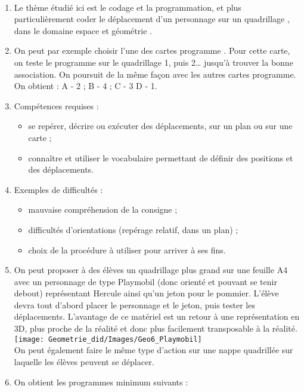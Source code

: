 \ \\ [-5mm]
\begin{enumerate}
   \item Le thème étudié ici est le codage et la programmation, et plus particulièrement \og coder le déplacement d'un personnage sur un quadrillage \fg{}, dans le domaine \og espace et géométrie \fg.
   \item On peut par exemple choisir l'une des cartes \og programme \fg{}. Pour cette carte, on teste le programme sur le quadrillage 1, puis 2\dots {} jusqu'à trouver la bonne association. On poursuit de la même façon avec les autres cartes programme. On obtient : A - 2 \quad ; \quad B - 4 \quad ; \quad C - 3 \quad D - 1.
   \item Compétences requises :
   \begin{itemize}
      \item se repérer, décrire ou exécuter des déplacements, sur un
plan ou sur une carte ;
      \item connaître et utiliser le vocabulaire permettant de définir des
positions et des déplacements.
   \end{itemize}
   \item Exemples de difficultés :
   \begin{itemize}
      \item mauvaise compréhension de la consigne ;
      \item difficultés d'orientations (repérage relatif, dans un plan) ;
      \item choix de la procédure à utiliser pour arriver à ses fins.
   \end{itemize}
   \item On peut proposer à des élèves un quadrillage plus grand sur une feuille A4 avec un personnage de type Playmobil (donc orienté et pouvant se tenir debout) représentant Hercule ainsi qu'un jeton pour le pommier. L'élève devra tout d'abord placer le personnage et le jeton, puis tester les déplacements. L'avantage de ce matériel est un retour à une représentation en 3D, plus proche de la réalité et donc plus facilement transposable à la réalité. \\
   \hspace*{3cm} \texttt{[image: Geometrie\_did/Images/Geo6\_Playmobil]} \\
   On peut également faire le même type d'action sur une nappe quadrillée sur laquelle les élèves peuvent se déplacer.
   \item On obtient les programmes minimum suivants : \\

\end{enumerate}
